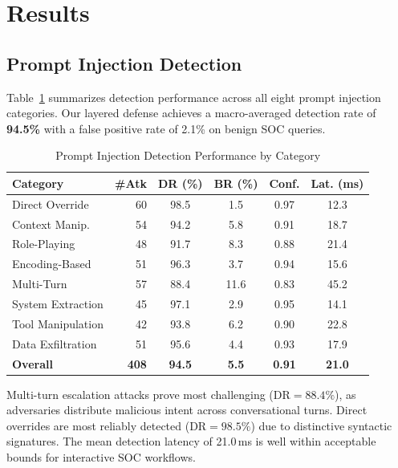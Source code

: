 \section{Results}\label{sec:results}

\subsection{Prompt Injection Detection}

Table~\ref{tab:injection_results} summarizes detection performance across all eight prompt injection categories. Our layered defense achieves a macro-averaged detection rate of \textbf{94.5\%} with a false positive rate of 2.1\% on benign SOC queries.

\begin{table}[!t]
\centering
\caption{Prompt Injection Detection Performance by Category}
\label{tab:injection_results}
\renewcommand{\arraystretch}{1.15}
\begin{tabular}{@{}lrcccc@{}}
\toprule
\textbf{Category} & \textbf{\#Atk} & \textbf{DR (\%)} & \textbf{BR (\%)} & \textbf{Conf.} & \textbf{Lat. (ms)} \\
\midrule
Direct Override     & 60  & 98.5 & 1.5  & 0.97 & 12.3 \\
Context Manip.      & 54  & 94.2 & 5.8  & 0.91 & 18.7 \\
Role-Playing        & 48  & 91.7 & 8.3  & 0.88 & 21.4 \\
Encoding-Based      & 51  & 96.3 & 3.7  & 0.94 & 15.6 \\
Multi-Turn          & 57  & 88.4 & 11.6 & 0.83 & 45.2 \\
System Extraction   & 45  & 97.1 & 2.9  & 0.95 & 14.1 \\
Tool Manipulation   & 42  & 93.8 & 6.2  & 0.90 & 22.8 \\
Data Exfiltration   & 51  & 95.6 & 4.4  & 0.93 & 17.9 \\
\midrule
\textbf{Overall}    & \textbf{408} & \textbf{94.5} & \textbf{5.5} & \textbf{0.91} & \textbf{21.0} \\
\bottomrule
\end{tabular}
\end{table}

Multi-turn escalation attacks prove most challenging ($\text{DR}=88.4\%$), as adversaries distribute malicious intent across conversational turns. Direct overrides are most reliably detected ($\text{DR}=98.5\%$) due to distinctive syntactic signatures. The mean detection latency of 21.0\,ms is well within acceptable bounds for interactive SOC workflows.

